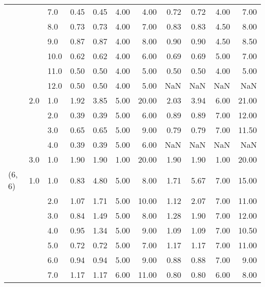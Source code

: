\begin{tabular}{lllrrrrrrrr}
       &     & 7.0  &       0.45 &      0.45 & 4.00 &   4.00 &       0.72 &      0.72 & 4.00 &   7.00 \\
       &     & 8.0  &       0.73 &      0.73 & 4.00 &   7.00 &       0.83 &      0.83 & 4.50 &   8.00 \\
       &     & 9.0  &       0.87 &      0.87 & 4.00 &   8.00 &       0.90 &      0.90 & 4.50 &   8.50 \\
       &     & 10.0 &       0.62 &      0.62 & 4.00 &   6.00 &       0.69 &      0.69 & 5.00 &   7.00 \\
       &     & 11.0 &       0.50 &      0.50 & 4.00 &   5.00 &       0.50 &      0.50 & 4.00 &   5.00 \\
       &     & 12.0 &       0.50 &      0.50 & 4.00 &   5.00 &        NaN &       NaN &  NaN &    NaN \\
       & 2.0 & 1.0  &       1.92 &      3.85 & 5.00 &  20.00 &       2.03 &      3.94 & 6.00 &  21.00 \\
       &     & 2.0  &       0.39 &      0.39 & 5.00 &   6.00 &       0.89 &      0.89 & 7.00 &  12.00 \\
       &     & 3.0  &       0.65 &      0.65 & 5.00 &   9.00 &       0.79 &      0.79 & 7.00 &  11.50 \\
       &     & 4.0  &       0.39 &      0.39 & 5.00 &   6.00 &        NaN &       NaN &  NaN &    NaN \\
       & 3.0 & 1.0  &       1.90 &      1.90 & 1.00 &  20.00 &       1.90 &      1.90 & 1.00 &  20.00 \\
(6, 6) & 1.0 & 1.0  &       0.83 &      4.80 & 5.00 &   8.00 &       1.71 &      5.67 & 7.00 &  15.00 \\
       &     & 2.0  &       1.07 &      1.71 & 5.00 &  10.00 &       1.12 &      2.07 & 7.00 &  11.00 \\
       &     & 3.0  &       0.84 &      1.49 & 5.00 &   8.00 &       1.28 &      1.90 & 7.00 &  12.00 \\
       &     & 4.0  &       0.95 &      1.34 & 5.00 &   9.00 &       1.09 &      1.09 & 7.00 &  10.50 \\
       &     & 5.0  &       0.72 &      0.72 & 5.00 &   7.00 &       1.17 &      1.17 & 7.00 &  11.00 \\
       &     & 6.0  &       0.94 &      0.94 & 5.00 &   9.00 &       0.88 &      0.88 & 7.00 &   9.00 \\
       &     & 7.0  &       1.17 &      1.17 & 6.00 &  11.00 &       0.80 &      0.80 & 6.00 &   8.00 \\

\end{tabular}
